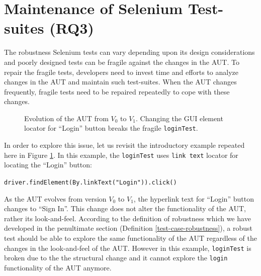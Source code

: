 \section{Maintenance of Selenium Test-suites (RQ3)}
\label{locatorMaintenance}
The robustness Selenium tests can vary depending upon its design considerations and poorly designed tests can be fragile against the changes in the AUT. To repair the fragile tests, developers need to invest time and efforts to analyze changes in the AUT and maintain such test-suites. When the AUT changes frequently, fragile tests need to be repaired repeatedly to cope with these changes. 

\begin{figure}[ht!]
\centering     %
{}
\vspace{-2mm}
  \captionsetup{justification=justified,
singlelinecheck=false}
\caption{Evolution of the AUT from $V_{0}$ to $V_{1}$. Changing the GUI element locator for ``Login'' button breaks the fragile \texttt{loginTest}.}
\label{fig:3loginTest}
\end{figure} 

In order to explore this issue, let us revisit the introductory example repeated here in Figure \ref{fig:3loginTest}. In this example, the \texttt{loginTest} uses \texttt{link text} locator for locating the ``Login'' button: \begin{small}
\texttt{driver.findElement(By.linkText("Login")).click()}
\end{small}
As the AUT evolves from version $V_{0}$ to $V_{1}$, the hyperlink text for ``Login'' button changes to ``Sign In''. This change does not alter the functionality of the AUT, rather its look-and-feel. According to the definition of robustness which we have developed in the penultimate section (Definition \ref{test-case-robustness}), a robust test should be able to explore the same functionality of the AUT regardless of the changes in the look-and-feel of the AUT. However in this example, \texttt{loginTest} is broken due to the the structural change and it cannot explore the \texttt{login} functionality of the AUT anymore. 

